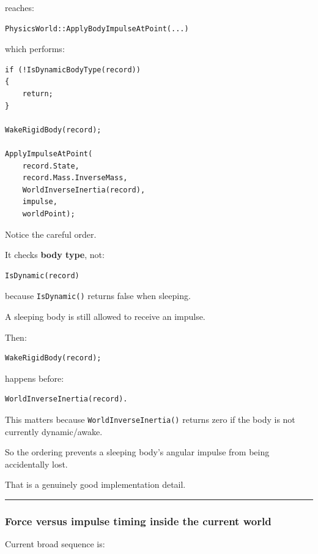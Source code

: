 reaches:

\begin{verbatim}
PhysicsWorld::ApplyBodyImpulseAtPoint(...)
\end{verbatim}

which performs:

\begin{verbatim}
if (!IsDynamicBodyType(record))
{
    return;
}

WakeRigidBody(record);

ApplyImpulseAtPoint(
    record.State,
    record.Mass.InverseMass,
    WorldInverseInertia(record),
    impulse,
    worldPoint);
\end{verbatim}

Notice the careful order.

It checks \textbf{body type}, not:

\begin{verbatim}
IsDynamic(record)
\end{verbatim}

because \texttt{IsDynamic()} returns false when sleeping.

A sleeping body is still allowed to receive an impulse.

Then:

\begin{verbatim}
WakeRigidBody(record);
\end{verbatim}

happens before:

\begin{verbatim}
WorldInverseInertia(record).
\end{verbatim}

This matters because \texttt{WorldInverseInertia()} returns zero if the body is not currently dynamic/awake.

So the ordering prevents a sleeping body's angular impulse from being accidentally lost.

That is a genuinely good implementation detail.

\begin{center}\rule{0.5\linewidth}{0.5pt}\end{center}

\subsubsection{Force versus impulse timing inside the current world}\label{force-versus-impulse-timing-inside-the-current-world}

Current broad sequence is:

